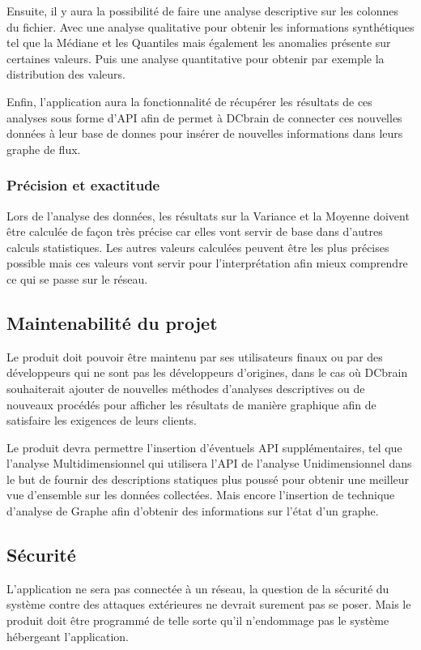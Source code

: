 			Ensuite, il y aura la possibilité de faire une analyse descriptive sur les colonnes du fichier. Avec une analyse qualitative pour obtenir les informations synthétiques tel que la Médiane et les Quantiles mais également les anomalies présente sur certaines valeurs. Puis une analyse quantitative pour obtenir par exemple la distribution des valeurs.\newline

			Enfin, l’application aura la fonctionnalité de récupérer les résultats de ces analyses sous forme d’API afin de permet à DCbrain de connecter ces nouvelles données à leur base de donnes pour insérer de nouvelles informations dans leurs graphe de flux.

			\subsubsection{Précision et exactitude}
			Lors de l'analyse des données, les résultats sur la Variance et la Moyenne doivent être calculée de façon très précise car elles vont servir de base dans d’autres calculs statistiques. Les autres valeurs calculées peuvent être les plus précises possible mais ces valeurs vont servir pour l'interprétation afin mieux comprendre ce qui se passe sur le réseau.

		\subsection{Maintenabilité du projet}
		Le produit doit pouvoir être maintenu par ses utilisateurs finaux ou par des développeurs qui ne sont pas les développeurs d’origines, dans le cas où DCbrain souhaiterait ajouter de nouvelles méthodes d’analyses descriptives ou de nouveaux procédés pour afficher les résultats de manière graphique afin de satisfaire les exigences de leurs clients.\newline
		
		Le produit devra permettre l'insertion d'éventuels API supplémentaires, tel que l'analyse Multidimensionnel qui utilisera l'API de l'analyse Unidimensionnel dans le but de fournir des descriptions statiques plus poussé pour obtenir une meilleur vue d'ensemble sur les données collectées. Mais encore l'insertion de technique d'analyse de Graphe afin d'obtenir des informations sur l'état d'un graphe.
		
		\subsection{Sécurité}
		L’application ne sera pas connectée à un réseau, la question de la sécurité du système contre des attaques extérieures ne devrait surement pas se poser. Mais le produit doit être programmé de telle sorte qu’il n’endommage pas le système hébergeant l’application.
		
